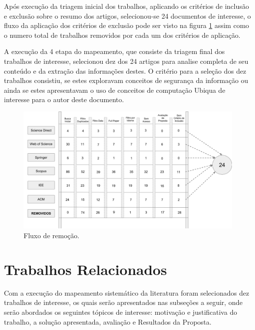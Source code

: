 \documentclass[tid,table]{texufpel} %
\begin{document}
Após execução da triagem inicial dos trabalhos, aplicando os critérios de inclusão e exclusão sobre o resumo dos artigos, selecionou-se 24 documentos de interesse, o fluxo da aplicação dos critérios de exclusão pode ser visto na figura \ref{fig:grafFluxoTriagemInicial} assim como o numero total de trabalhos removidos por cada um dos critérios de aplicação. 

A execução da 4 etapa do mapeamento, que consiste da triagem final dos trabalhos de interesse, selecionou dez dos 24 artigos para analise completa de seu conteúdo e da extração das informações destes. O critério para a seleção dos dez trabalhos consistiu, se estes exploravam conceitos de segurança da informação ou ainda se estes apresentavam o uso de conceitos de computação Ubiqua de interesse para o autor deste documento.    


\begin{landscape}
\begin{figure}[ht]
	\centering
	\includegraphics[width=1.7\textwidth]{imagens/FluxoTriagemInicial.png}
	\caption{Fluxo de remoção.}
	\label{fig:grafFluxoTriagemInicial}
\end{figure}
\end{landscape}


\section{Trabalhos Relacionados}
Com a execução do mapeamento sistemático da literatura
foram selecionados dez trabalhos de interesse, os quais serão apresentados nas subseções a seguir, onde serão abordados os seguintes tópicos de interesse: motivação e justificativa do trabalho, a solução apresentada, avaliação e Resultados da Proposta.


\end{document}
